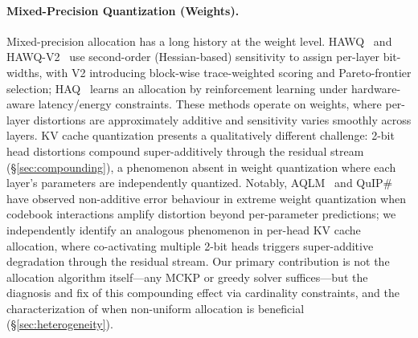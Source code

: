 \paragraph{Mixed-Precision Quantization (Weights).}
Mixed-precision allocation has a long history at the weight level.
HAWQ~\cite{dong2019hawq} and HAWQ-V2~\cite{dong2020hawqv2} use second-order (Hessian-based) sensitivity to assign per-layer bit-widths, with V2 introducing block-wise trace-weighted scoring and Pareto-frontier selection; HAQ~\cite{wang2019haq} learns an allocation by reinforcement learning under hardware-aware latency/energy constraints.
These methods operate on weights, where per-layer distortions are approximately additive and sensitivity varies smoothly across layers.
KV cache quantization presents a qualitatively different challenge: 2-bit head distortions compound super-additively through the residual stream (\S\ref{sec:compounding}), a phenomenon absent in weight quantization where each layer's parameters are independently quantized.
Notably, AQLM~\cite{egiazarian2024aqlm} and QuIP\#~\cite{tseng2024quipsharp} have observed non-additive error behaviour in extreme weight quantization when codebook interactions amplify distortion beyond per-parameter predictions; we independently identify an analogous phenomenon in per-head KV cache allocation, where co-activating multiple 2-bit heads triggers super-additive degradation through the residual stream.
Our primary contribution is not the allocation algorithm itself---any MCKP or greedy solver suffices---but the diagnosis and fix of this compounding effect via cardinality constraints, and the characterization of when non-uniform allocation is beneficial (\S\ref{sec:heterogeneity}).

